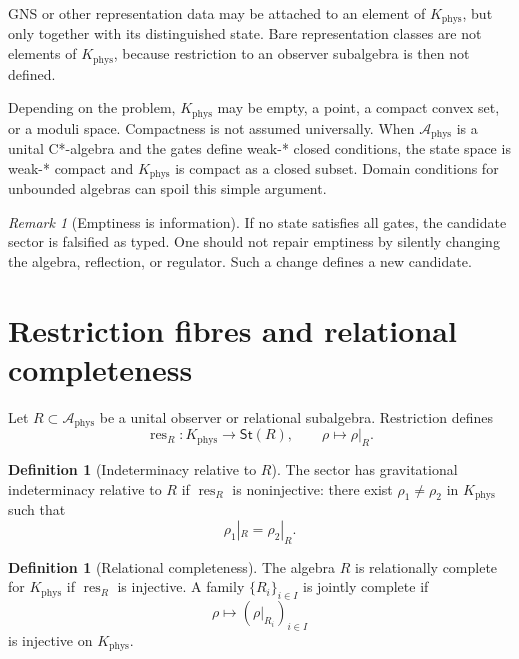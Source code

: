 \documentclass[11pt,a4paper]{article}
\theoremstyle{definition}
\newtheorem{definition}[theorem]{Definition}
\theoremstyle{remark}
\newtheorem{remark}[theorem]{Remark}
\newcommand{\A}{\mathcal A}
\newcommand{\St}{\mathsf{St}}
\newcommand{\Kphys}{K_{\mathrm{phys}}}
\newcommand{\res}{\operatorname{res}}
\begin{document}
GNS or other representation data may be attached to an element of $\Kphys$,
but only together with its distinguished state.  Bare representation classes
are not elements of $\Kphys$, because restriction to an observer subalgebra is
then not defined.

Depending on the problem, $\Kphys$ may be empty, a point, a compact convex set,
or a moduli space.  Compactness is not assumed universally.  When
$\A_{\mathrm{phys}}$ is a unital C*-algebra and the gates define weak-* closed
conditions, the state space is weak-* compact and $\Kphys$ is compact as a
closed subset.  Domain conditions for unbounded algebras can spoil this simple
argument.

\begin{remark}[Emptiness is information]
If no state satisfies all gates, the candidate sector is falsified as typed.
One should not repair emptiness by silently changing the algebra, reflection,
or regulator.  Such a change defines a new candidate.
\end{remark}

\section{Restriction fibres and relational completeness}

Let $R\subset\A_{\mathrm{phys}}$ be a unital observer or relational
subalgebra.  Restriction defines
\begin{equation}
\res_R:\Kphys\longrightarrow\St(R),\qquad\rho\longmapsto\rho|_R.
\label{eq:restriction-intro}
\end{equation}

\begin{definition}[Indeterminacy relative to $R$]
The sector has gravitational indeterminacy relative to $R$ if
$\res_R$ is noninjective: there exist $\rho_1\ne\rho_2$ in $\Kphys$ such that
\begin{equation}
   \rho_1|_R=\rho_2|_R .
   \label{eq:gip}
\end{equation}
\end{definition}

\begin{definition}[Relational completeness]
The algebra $R$ is relationally complete for $\Kphys$ if $\res_R$ is
injective.  A family $\{R_i\}_{i\in I}$ is jointly complete if
\begin{equation}
  \rho\longmapsto(\rho|_{R_i})_{i\in I}
  \label{eq:joint-complete}
\end{equation}
is injective on $\Kphys$.
\end{definition}
\end{document}
